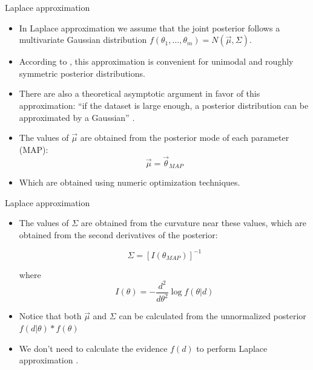 \documentclass[handout]{beamer}
\begin{document}
\begin{frame}{Laplace approximation}
\scriptsize{

\begin{itemize}
\item In Laplace approximation we assume that the joint posterior follows a multivariate Gaussian distribution $f(\theta_1,\dots,\theta_m) = N(\vec{\mu},\Sigma)$.

\item  According to \cite{gelman2013bayesian}, this approximation is convenient for unimodal and roughly symmetric posterior distributions.

\item There are also a theoretical asymptotic argument in favor of this approximation: ``if the dataset is large enough, a posterior distribution can be approximated by a Gaussian'' \cite{gelman2013bayesian}.

\item The values of $\vec{\mu}$ are obtained from the posterior mode of each parameter (MAP):
\begin{displaymath}
 \vec{\mu} = \vec{\theta}_{MAP}
\end{displaymath}

\item Which are obtained using numeric optimization techniques.


\end{itemize}


} 
\end{frame}



\begin{frame}{Laplace approximation}
\scriptsize{

\begin{itemize}

\item The values of $\Sigma$ are obtained from the curvature near these values, which are obtained from the second derivatives of the posterior:

\begin{displaymath}
 \Sigma = [I({\theta}_{MAP})]^{-1}
\end{displaymath}

where  \begin{displaymath}
        I(\theta) = - \frac{d^2}{d\theta^2} \log f(\theta|d)
       \end{displaymath}



\item Notice that both  $\vec{\mu}$ and $\Sigma$ can be calculated from the unnormalized posterior 
$f(d|\theta)*f(\theta)$

\item We don't need to calculate the evidence $f(d)$ to perform Laplace approximation \cite{laplaceApp}.

\end{itemize}


} 
\end{frame}
\end{document}
